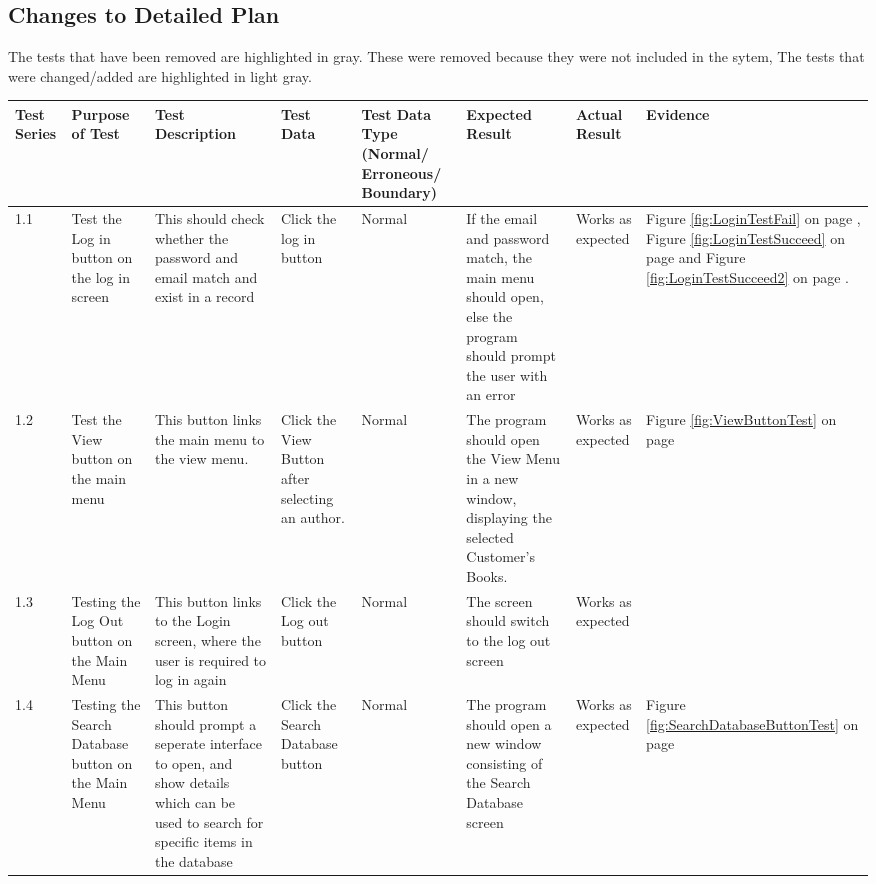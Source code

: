 \begin{landscape}
\subsection{Changes to Detailed Plan}

The tests that have been removed are highlighted in gray. These were removed because they were not included in the sytem, The tests that were changed/added are highlighted in light gray.

\begin{center}
    \begin{longtable}{|p{1.5cm}|p{2cm}|p{2.5cm}|p{2.5cm}|p{2cm}|p{2cm}|p{2cm}|p{2cm}|}
        \hline
        \textbf{Test Series} & \textbf{Purpose of Test} & \textbf{Test Description} & \textbf{Test Data} & \textbf{Test Data Type (Normal/ Erroneous/ Boundary)} & \textbf{Expected Result} & \textbf{Actual Result} & \textbf{Evidence}\\ \hline
        1.1 & Test the Log in button on the log in screen & This should check whether the password and email match and exist in a record & Click the log in button & Normal & If the email and password match, the main menu should open, else the program should prompt the user with an error & Works as expected & Figure \ref{fig:LoginTestFail} on page \pageref{fig:LoginTestFail}, Figure \ref{fig:LoginTestSucceed} on page \pageref{fig:LoginTestSucceed} and Figure \ref{fig:LoginTestSucceed2} on page \pageref{fig:LoginTestSucceed2} . \\ \hline
        1.2 & Test the View button on the main menu & This button links the main menu to the view menu. & Click the View Button after selecting an author. & Normal & The program should open the View Menu in a new window, displaying the selected Customer's Books. & Works as expected & Figure \ref{fig:ViewButtonTest} on page \pageref{fig:ViewButtonTest} \\ \hline
        1.3 & Testing the Log Out button on the Main Menu & This button links to the Login screen, where the user is required to log in again & Click the Log out button & Normal & The screen should switch to the log out screen & Works as expected & \\ \hline
        1.4 & Testing the Search Database button on the Main Menu & This button should prompt a seperate interface to open, and show details which can be used to search for specific items in the database & Click the Search Database button & Normal & The program should open a new window consisting of the Search Database screen & Works as expected & Figure \ref{fig:SearchDatabaseButtonTest} on page \pageref{fig:SearchDatabaseButtonTest} \\ \hline

\end{longtable}
\end{center}
\end{landscape}
